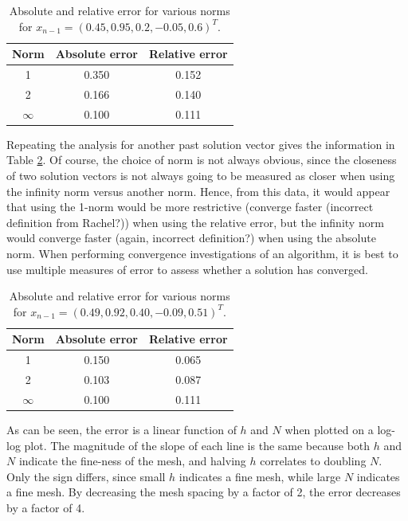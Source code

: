 \documentclass[10pt]{article}
\newcommand*\circled[1]{\tikz[baseline=(char.base)]{
            \node[shape=circle,draw,inner sep=2pt] (char) {#1};}}
\begin{document}
\begin{table}[H]
\caption{Absolute and relative error for various norms for \(x_{n-1}=(0.45, 0.95, 0.2, -0.05, 0.6)^T\).}
\centering
\begin{tabular}{c c c}
\hline\hline
Norm & Absolute error & Relative error\\ [0.5ex]
\hline
1 & 0.350 & 0.152\\
2 & 0.166 & 0.140\\
\(\infty\) & 0.100 & 0.111\\
\hline
\end{tabular}
\label{table:3}
\end{table}

Repeating the analysis for another past solution vector gives the information in Table \ref{table:4}. Of course, the choice of norm is not always obvious, since the closeness of two solution vectors is not always going to be measured as closer when using the infinity norm versus another norm. Hence, from this data, it would appear that using the 1-norm would be more restrictive (converge faster (incorrect definition from Rachel?)) when using the relative error, but the infinity norm would converge faster (again, incorrect definition?) when using the absolute norm. When performing convergence investigations of an algorithm, it is best to use multiple measures of error to assess whether a solution has converged.

\begin{table}[H]
\caption{Absolute and relative error for various norms for \(x_{n-1}=(0.49, 0.92, 0.40, -0.09, 0.51)^T\).}
\centering
\begin{tabular}{c c c}
\hline\hline
Norm & Absolute error & Relative error\\ [0.5ex]
\hline
1 & 0.150 & 0.065\\
2 & 0.103 & 0.087\\
\(\infty\) & 0.100 & 0.111\\
\hline
\end{tabular}
\label{table:4}
\end{table}

\circled{4}\newline

As can be seen, the error is a linear function of \(h\) and \(N\) when plotted on a log-log plot. The magnitude of the slope of each line is the same because both \(h\) and \(N\) indicate the fine-ness of the mesh, and halving \(h\) correlates to doubling \(N\). Only the sign differs, since small \(h\) indicates a fine mesh, while large \(N\) indicates a fine mesh. By decreasing the mesh spacing by a factor of 2, the error decreases by a factor of 4. 
\end{document}
